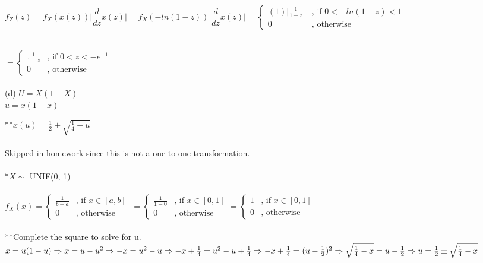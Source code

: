 \documentclass[letterpaper,11pt]{article}
\begin{document}
$f_Z(z) = f_X(x(z)) \bigg| \dfrac{d}{dz} x(z) \bigg|
= f_X(-ln(1-z)) \bigg| \dfrac{d}{dz} x(z) \bigg|
=\begin{cases}
	(1) \Big| \frac{1}{1-z} \Big|  & \text{,	if } 0<-ln(1-z)<1 \\
	0 & \text{,		otherwise}
\end{cases}$\\
\vspace{1mm}\\
\par \hspace{3.55in}
$=\begin{cases}
	\frac{1}{1-z}  & \text{,	if } 0<z<-e^{-1}\\
	0 & \text{,		otherwise}
\end{cases}
$\\
\vspace{0.25in}\\
(d) $U = X(1 - X)$\\

$u = x(1-x)$ \par
**$ x(u) = \frac{1}{2} \pm \sqrt{\frac{1}{4}-u}$\\
\vspace{0.05in}\\
Skipped in homework since this is not a one-to-one transformation. \\
\vspace{0.25in}\\
*$X \sim$ UNIF(0, 1)\\
\vspace{1mm}\\
$f_X(x) =
\begin{cases}
	\frac{1}{b-a} & \text{,	if } x \in [a,b]\\
	0 & \text{,		otherwise}
\end{cases}\
=\begin{cases}
	\frac{1}{1-0} & \text{,	if } x \in [0,1]\\
	0 & \text{,		otherwise}
\end{cases}
=\begin{cases}
	1 & \text{,	if } x \in [0,1]\\
	0 & \text{,		otherwise}
\end{cases}
$\\
\vspace{0.25in}\\
**Complete the square to solve for u. \\
$x = u(1-u)\\
\Rightarrow x = u-u^2\\
\Rightarrow -x = u^2 - u\\
\Rightarrow -x + \frac{1}{4} = u^2 - u + \frac{1}{4}\\  
\Rightarrow -x + \frac{1}{4} = (u - \frac{1}{2})^2\\
\Rightarrow \sqrt{\frac{1}{4}-x} = u - \frac{1}{2}\\
\Rightarrow u = \frac{1}{2} \pm \sqrt{\frac{1}{4}-x}
$\\
\end{document}
